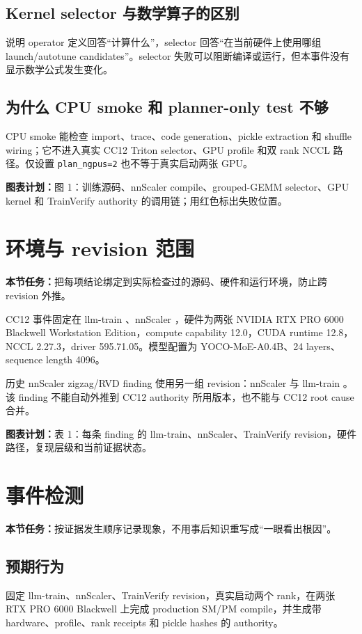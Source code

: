 \documentclass[11pt,a4paper]{ctexart}
\newcommand{\contract}[1]{\par\smallskip\noindent\colorbox{light}{\parbox{0.95\linewidth}{\textbf{本节任务：}#1}}\par\smallskip}
\newcommand{\figplan}[1]{\par\noindent\textbf{图表计划：}#1\par}
\begin{document}
\subsection{Kernel selector 与数学算子的区别}
说明 operator 定义回答“计算什么”，selector 回答“在当前硬件上使用哪组 launch/autotune candidates”。selector 失败可以阻断编译或运行，但本事件没有显示数学公式发生变化。

\subsection{为什么 CPU smoke 和 planner-only test 不够}
CPU smoke 能检查 import、trace、code generation、pickle extraction 和 shuffle wiring；它不进入真实 CC12 Triton selector、GPU profile 和双 rank NCCL 路径。仅设置 \texttt{plan\_ngpus=2} 也不等于真实启动两张 GPU。

\figplan{图 1：训练源码、nnScaler compile、grouped-GEMM selector、GPU kernel 和 TrainVerify authority 的调用链；用红色标出失败位置。}

\section{环境与 revision 范围}
\contract{把每项结论绑定到实际检查过的源码、硬件和运行环境，防止跨 revision 外推。}

CC12 事件固定在 llm-train 、nnScaler ，硬件为两张 NVIDIA RTX PRO 6000 Blackwell Workstation Edition，compute capability 12.0，CUDA runtime 12.8，NCCL 2.27.3，driver 595.71.05。模型配置为 YOCO-MoE-A0.4B、24 layers、sequence length 4096。

历史 nnScaler zigzag/RVD finding 使用另一组 revision：nnScaler  与 llm-train 。该 finding 不能自动外推到 CC12 authority 所用版本，也不能与 CC12 root cause 合并。

\figplan{表 1：每条 finding 的 llm-train、nnScaler、TrainVerify revision，硬件路径，复现层级和当前证据状态。}

\section{事件检测}
\contract{按证据发生顺序记录现象，不用事后知识重写成“一眼看出根因”。}

\subsection{预期行为}
固定 llm-train、nnScaler、TrainVerify revision，真实启动两个 rank，在两张 RTX PRO 6000 Blackwell 上完成 production SM/PM compile，并生成带 hardware、profile、rank receipts 和 pickle hashes 的 authority。
\end{document}
